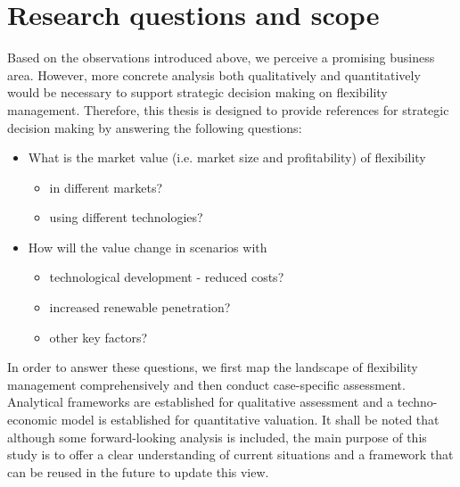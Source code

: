 
\section{Research questions and scope}

Based on the observations introduced above, we perceive a promising business area. However, more concrete analysis both qualitatively and quantitatively would be necessary to support strategic decision making on flexibility management. Therefore, this thesis is designed to provide references for strategic decision making by answering the following questions:

\begin{itemize}
	\item What is the market value (i.e. market size and profitability) of flexibility
	\begin{itemize}
		\item in different markets?
		\item using different technologies?
	\end{itemize}
	\item How will the value change in scenarios with
	\begin{itemize}
		\item technological development - reduced costs?
		\item increased renewable penetration?
		\item other key factors?
	\end{itemize}
\end{itemize}

In order to answer these questions, we first map the landscape of flexibility management comprehensively and then conduct case-specific assessment. Analytical frameworks are established for qualitative assessment and a techno-economic model is established for quantitative valuation. It shall be noted that although some forward-looking analysis is included, the main purpose of this study is to offer a clear understanding of current situations and a framework that can be reused in the future to update this view.

